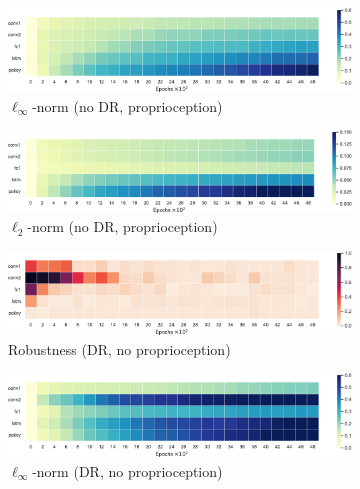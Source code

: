\begin{figure}[h!]
  \begin{subfigure}{0.32\textwidth}
    \includegraphics[width=\textwidth]{figures/chapter6/robustness/fetch/sensor_std/inf_dist}
    \caption{$\ell_\infty$-norm (no DR, proprioception)}
  \end{subfigure}
  \begin{subfigure}{0.32\textwidth}
    \includegraphics[width=\textwidth]{figures/chapter6/robustness/fetch/sensor_std/l2_dist}
    \caption{$\ell_2$-norm (no DR, proprioception)}
  \end{subfigure}
  \begin{subfigure}{0.32\textwidth}
    \includegraphics[width=\textwidth]{figures/chapter6/robustness/fetch/visual_random/error}
    \caption{Robustness (DR, no proprioception)}
  \end{subfigure}
  \begin{subfigure}{0.32\textwidth}
    \includegraphics[width=\textwidth]{figures/chapter6/robustness/fetch/visual_random/inf_dist}
    \caption{$\ell_\infty$-norm (DR, no proprioception)}
  \end{subfigure}
  \begin{subfigure}{0.32\textwidth}

\end{subfigure}
\end{figure}
